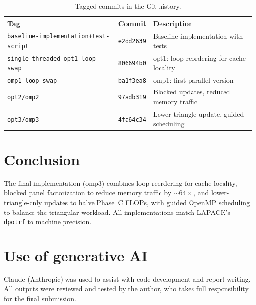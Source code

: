 \documentclass[10pt,leqno]{amsart}
\begin{document}
\begin{table}[H]
\centering
\begin{tabular}{l l l}
\hline
\textbf{Tag} & \textbf{Commit} & \textbf{Description} \\
\hline
\texttt{baseline-implementation+test-script} & \texttt{e2dd2639} & Baseline implementation with tests \\
\texttt{single-threaded-opt1-loop-swap} & \texttt{806694b0} & opt1: loop reordering for cache locality \\
\texttt{omp1-loop-swap} & \texttt{ba1f3ea8} & omp1: first parallel version \\
\texttt{opt2/omp2} & \texttt{97adb319} & Blocked updates, reduced memory traffic \\
\texttt{opt3/omp3} & \texttt{4fa64c34} & Lower-triangle update, guided scheduling \\
\hline
\end{tabular}
\caption{Tagged commits in the Git history.}
\label{tab:tags}
\end{table}

\section{Conclusion}

The final implementation (omp3) combines loop reordering for cache locality,
blocked panel factorization to reduce memory traffic by $\sim 64\times$, and
lower-triangle-only updates to halve Phase~C FLOPs, with guided OpenMP
scheduling to balance the triangular workload. All implementations match
LAPACK's \texttt{dpotrf} to machine precision.

\section*{Use of generative AI}
Claude (Anthropic) was used to assist with code development and
report writing. All outputs were reviewed and tested by the author,
who takes full responsibility for the final submission.

\end{document}
